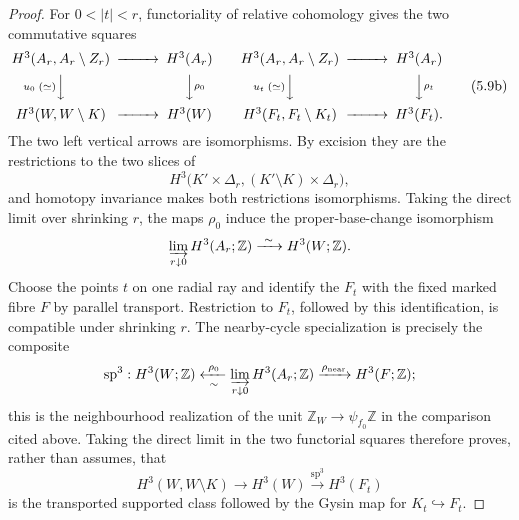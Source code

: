\begin{proof}
For \(0<|t|<r\), functoriality of relative cohomology gives the two
commutative squares
\[
\begin{CD}
H^3(A_r,A_r\setminus Z_r) @>>> H^3(A_r)\\
@V{u_0\;(\simeq)}VV                  @VV{\rho_0}V\\
H^3(W,W\setminus K) @>>> H^3(W)
\end{CD}
\qquad
\begin{CD}
H^3(A_r,A_r\setminus Z_r) @>>> H^3(A_r)\\
@V{u_t\;(\simeq)}VV                  @VV{\rho_t}V\\
H^3(F_t,F_t\setminus K_t) @>>> H^3(F_t).
\end{CD}
\tag{5.9b}
\]
The two left vertical arrows are isomorphisms.  By excision they are the
restrictions to the two slices of
\[
 H^3\bigl(K'\times\Delta_r,
          (K'\setminus K)\times\Delta_r\bigr),
\]
and homotopy invariance makes both restrictions isomorphisms.  Taking the
direct limit over shrinking \(r\), the maps \(\rho_0\) induce the
proper-base-change isomorphism
\[
 \varinjlim_{r\downarrow0}H^3(A_r;\mathbb Z)
 \xrightarrow{\ \sim\ }H^3(W;\mathbb Z).
\]
Choose the points \(t\) on one radial ray and identify the \(F_t\) with the
fixed marked fibre \(F\) by parallel transport.  Restriction to \(F_t\),
followed by this identification, is compatible under shrinking \(r\).
The nearby-cycle specialization is precisely the composite
\[
 \operatorname{sp}^3:
 H^3(W;\mathbb Z)
 \xleftarrow[\ \sim\ ]{\rho_0}
 \varinjlim_{r\downarrow0}H^3(A_r;\mathbb Z)
 \xrightarrow{\rho_{\rm near}}H^3(F;\mathbb Z);
\]
this is the neighbourhood realization of the unit
\(\mathbb Z_W\to\psi_{f_0}\mathbb Z\) in the comparison cited above.
Taking the direct limit in the two functorial squares therefore proves,
rather than assumes, that
\[
 H^3(W,W\setminus K)\longrightarrow H^3(W)
 \xrightarrow{\operatorname{sp}^3}H^3(F_t)
\tag{5.9c}
\]
is the transported supported class followed by the Gysin map for
\(K_t\hookrightarrow F_t\).


\end{proof}
